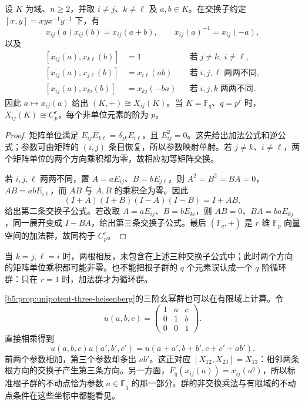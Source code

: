 \begin{proposition}\label{b5:prop:F-elementary-relations}
	设 \(K\) 为域、\(n\ge2\)，并取 \(i\ne j\)、\(k\ne\ell\) 及 \(a,b\in K\)。在交换子约定 \([x,y]=xyx^{-1}y^{-1}\) 下，有
	\[
		x_{ij}(a)x_{ij}(b)=x_{ij}(a+b),\qquad x_{ij}(a)^{-1}=x_{ij}(-a),
	\]
	以及
	\[
		\begin{aligned}
			[x_{ij}(a),x_{k\ell}(b)]&=1&&\text{若}\;j\ne k,\ i\ne\ell,\\
			[x_{ij}(a),x_{j\ell}(b)]&=x_{i\ell}(ab)&&\text{若}\;i,j,\ell\;\text{两两不同},\\
			[x_{ij}(a),x_{ki}(b)]&=x_{kj}(-ba)&&\text{若}\;i,j,k\;\text{两两不同}.
		\end{aligned}
	\]
	因此 \(a\mapsto x_{ij}(a)\) 给出 \((K,+)\cong X_{ij}(K)\)。当 \(K=\mathbb F_q\)、\(q=p^r\) 时，\(X_{ij}(K)\cong C_p^r\)，每个非单位元素的阶为 \(p\)。
\end{proposition}
\begin{proof}
	矩阵单位满足 \(E_{ij}E_{k\ell}=\delta_{jk}E_{i\ell}\)，且 \(E_{ij}^2=0\)。这先给出加法公式和逆公式；参数可由矩阵的 \((i,j)\) 条目恢复，所以参数映射单射。若 \(j\ne k\)、\(i\ne\ell\)，两个矩阵单位的两个方向乘积都为零，故相应初等矩阵交换。

	若 \(i,j,\ell\) 两两不同，置 \(A=aE_{ij}\)、\(B=bE_{j\ell}\)，则 \(A^2=B^2=BA=0\)，\(AB=abE_{i\ell}\)，而 \(AB\) 与 \(A,B\) 的乘积全为零。因此
	\[
		(I+A)(I+B)(I-A)(I-B)=I+AB,
	\]
	给出第二条交换子公式。若改取 \(A=aE_{ij}\)、\(B=bE_{ki}\)，则 \(AB=0\)、\(BA=baE_{kj}\)，同一展开变成 \(I-BA\)，给出第三条交换子公式。最后 \((\mathbb F_q,+)\) 是 \(r\) 维 \(\mathbb F_p\) 向量空间的加法群，故同构于 \(C_p^r\)。
\end{proof}
当 \(k=j,\ell=i\) 时，两根相反，未包含在上述三种交换子公式中；此时两个方向的矩阵单位乘积都可能非零。也不能把根子群的 \(q\) 个元素误认成一个 \(q\) 阶循环群：只在 \(r=1\) 时，加法群才为循环群。

\ProseParagraphBreak

\cref{b5:prop:unipotent-three-heisenberg}的三阶幺幂群也可以在有限域上计算。令
\[
	u(a,b,c)=\begin{pmatrix}1&a&c\\0&1&b\\0&0&1\end{pmatrix}.
\]
直接相乘得到
\[
	u(a,b,c)u(a',b',c')
	=u(a+a',b+b',c+c'+ab').
\]
前两个参数相加，第三个参数却多出 \(ab'\)。这正对应 \([X_{12},X_{23}]=X_{13}\)：相邻两条根方向的交换子产生第三条方向。另一方面，\(F_q(x_{ij}(a))=x_{ij}(a^q)\)，所以标准根子群的不动点恰为参数 \(a\in\mathbb F_q\) 的那一部分。群的非交换乘法与有限域的不动点条件在这些坐标中都能看见。

